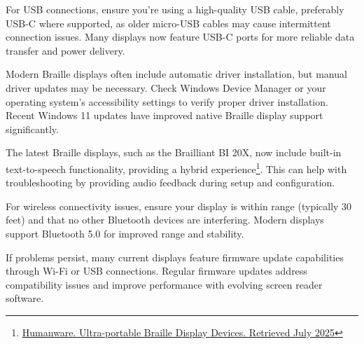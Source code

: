 For USB connections, ensure you're using a high-quality USB cable, preferably USB-C where supported, as older micro-USB cables may cause intermittent connection issues. Many displays now feature USB-C ports for more reliable data transfer and power delivery.

Modern Braille displays often include automatic driver installation, but manual driver updates may be necessary. Check Windows Device Manager or your operating system's accessibility settings to verify proper driver installation. Recent Windows 11 updates have improved native Braille display support significantly.

The latest Braille displays, such as the Brailliant BI 20X, now include built-in text-to-speech functionality, providing a hybrid experience\footnote{\raggedright \href{https://store.humanware.com/hus/braille-devices/ultra-portable-braille-display}{Humanware. Ultra-portable Braille Display Devices. Retrieved July 2025}}. This can help with troubleshooting by providing audio feedback during setup and configuration.

For wireless connectivity issues, ensure your display is within range (typically 30 feet) and that no other Bluetooth devices are interfering. Modern displays support Bluetooth 5.0 for improved range and stability.

If problems persist, many current displays feature firmware update capabilities through Wi-Fi or USB connections. Regular firmware updates address compatibility issues and improve performance with evolving screen reader software.

